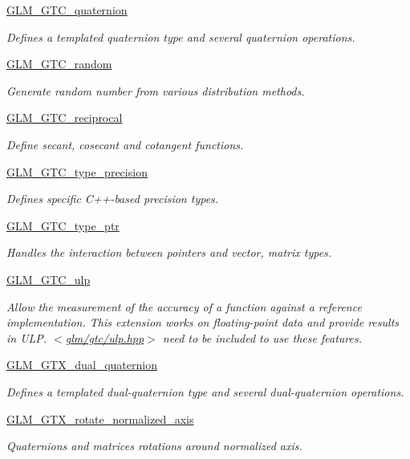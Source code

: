 \begin{DoxyCompactItemize}
\hyperlink{group__gtc__quaternion}{G\-L\-M\-\_\-\-G\-T\-C\-\_\-quaternion}
\begin{DoxyCompactList}\small\item\em Defines a templated quaternion type and several quaternion operations. \end{DoxyCompactList}\item 
\hyperlink{group__gtc__random}{G\-L\-M\-\_\-\-G\-T\-C\-\_\-random}
\begin{DoxyCompactList}\small\item\em Generate random number from various distribution methods. \end{DoxyCompactList}\item 
\hyperlink{group__gtc__reciprocal}{G\-L\-M\-\_\-\-G\-T\-C\-\_\-reciprocal}
\begin{DoxyCompactList}\small\item\em Define secant, cosecant and cotangent functions. \end{DoxyCompactList}\item 
\hyperlink{group__gtc__type__precision}{G\-L\-M\-\_\-\-G\-T\-C\-\_\-type\-\_\-precision}
\begin{DoxyCompactList}\small\item\em Defines specific C++-\/based precision types. \end{DoxyCompactList}\item 
\hyperlink{group__gtc__type__ptr}{G\-L\-M\-\_\-\-G\-T\-C\-\_\-type\-\_\-ptr}
\begin{DoxyCompactList}\small\item\em Handles the interaction between pointers and vector, matrix types. \end{DoxyCompactList}\item 
\hyperlink{group__gtc__ulp}{G\-L\-M\-\_\-\-G\-T\-C\-\_\-ulp}
\begin{DoxyCompactList}\small\item\em Allow the measurement of the accuracy of a function against a reference implementation. This extension works on floating-\/point data and provide results in U\-L\-P. $<$\hyperlink{gtc_2ulp_8hpp}{glm/gtc/ulp.\-hpp}$>$ need to be included to use these features. \end{DoxyCompactList}\item 
\hyperlink{group__gtc__dual__quaternion}{G\-L\-M\-\_\-\-G\-T\-X\-\_\-dual\-\_\-quaternion}
\begin{DoxyCompactList}\small\item\em Defines a templated dual-\/quaternion type and several dual-\/quaternion operations. \end{DoxyCompactList}\item 
\hyperlink{group__gtx__rotate__normalized__axis}{G\-L\-M\-\_\-\-G\-T\-X\-\_\-rotate\-\_\-normalized\-\_\-axis}
\begin{DoxyCompactList}\small\item\em Quaternions and matrices rotations around normalized axis. \end{DoxyCompactList}\end{DoxyCompactItemize}


